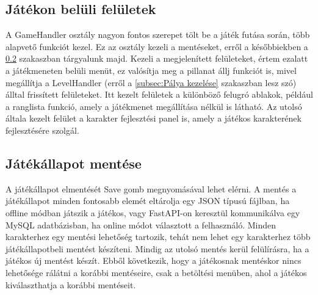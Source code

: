 \subsection{Játékon belüli felületek} \label{subsec:A játék fő osztálya}
 A GameHandler osztály nagyon fontos szerepet tölt be a játék futása során, több alapvető funkciót kezel. Ez az osztály kezeli a mentéseket, erről a későbbiekben a \ref{subsec:Játékállapot mentése} szakaszban tárgyalunk majd. 
Kezeli a megjelenített felületeket, értem ezalatt a játékmeneten belüli menüt, ez valósítja meg a pillanat állj funkciót is, mivel megállítja a LevelHandler (erről a \ref{subsec:Pálya kezelése} szakaszban lesz szó) álltal frissített felületeket. Itt kezelt felületek a különböző felugró ablakok, például a ranglista funkció, amely a játékmenet megállítása nélkül is látható. Az utolsó általa kezelt felület a karakter fejlesztési panel is, amely a játékos karakterének fejlesztésére szolgál.

\subsection{Játékállapot mentése} \label{subsec:Játékállapot mentése}
 A játékállapot elmentését Save gomb megnyomásával lehet elérni. A mentés a játékállapot minden fontosabb elemét eltárolja egy JSON típusú fájlban, ha offline módban játszik a játékos, vagy FastAPI-on \cite{fastapi} keresztül kommunikálva egy MySQL \cite{mysql} adatbázisban, ha online módot választott a felhasználó. 
Minden karakterhez egy mentési lehetőség tartozik, tehát nem lehet egy karakterhez több játékállapotbeli mentést készíteni. Mindig az utolsó mentés kerül felülírásra, ha a játékos új mentést készít. Ebből következik, hogy a játékosnak mentéskor nincs lehetősége rálátni a korábbi mentéseire, csak a betöltési menüben, ahol a játékos kiválaszthatja a korábbi mentéseit.

